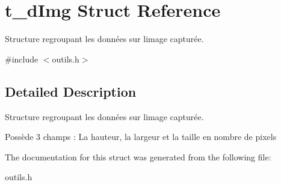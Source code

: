 \hypertarget{structt__dImg}{}\section{t\+\_\+d\+Img Struct Reference}
\label{structt__dImg}


Structure regroupant les données sur l\textquotesingle{}image capturée.  




{\ttfamily \#include $<$outils.\+h$>$}



\subsection{Detailed Description}
Structure regroupant les données sur l\textquotesingle{}image capturée. 

Possède 3 champs \+: La hauteur, la largeur et la taille en nombre de pixels 

The documentation for this struct was generated from the following file\+:\begin{DoxyCompactItemize}
\item 
outils.\+h\end{DoxyCompactItemize}
